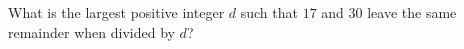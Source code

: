 What is the largest positive integer $d$ such that $17$ and $30$ leave the same remainder when divided by $d$?
